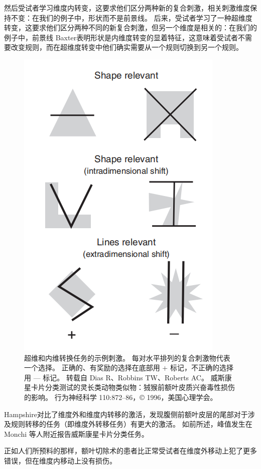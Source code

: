 然后受试者学习维度内转变，这要求他们区分两种新的复合刺激，相关刺激维度保持不变：在我们的例子中，形状而不是前景线。 
后来，受试者学习了一种超维度转变，这要求他们区分两种不同的新复合刺激，但另一个维度是相关的：在我们的例子中，前景线 Baxter\cite{baxter2007orbital}表明形状是内维度转变的显着特征，这意味着受试者不需要改变规则，而在超维度转变中他们确实需要从一个规则切换到另一个规则。


  \begin{figure}
  	\centering
  	\includegraphics[width=0.6\linewidth]{image_pfc/Fig_7_10}
  	\caption{超维和内维转换任务的示例刺激。 
  		每对水平排列的复合刺激物代表一个选择。 
  		正确的、有奖励的选择在底部用 + 标记，不正确的选择用 — 标记。
  		转载自 Dias R、Robbins TW、Roberts AC。 
  		威斯康星卡片分类测试的灵长类动物类似物：狨猴前额叶皮质兴奋毒性损伤的影响。 
  		行为神经科学 110:872–86，© 1996，美国心理学会。\label{fig:7_10}}
  \end{figure}
\par


Hampshire\cite{hampshire2006fractionating}对比了维度外和维度内转移的激活，发现腹侧前额叶皮层的尾部对于涉及规则转移的任务（即维度外转移任务）有更大的激活。 
如前所述，峰值发生在 Monchi 等人附近\cite{monchi2001wisconsin}报告威斯康星卡片分类任务。
\par


正如人们所预料的那样，额叶切除术的患者比正常受试者在维度外移动上犯了更多错误，但在维度内移动上没有损伤\cite{owen1993contrasting}。
\par


